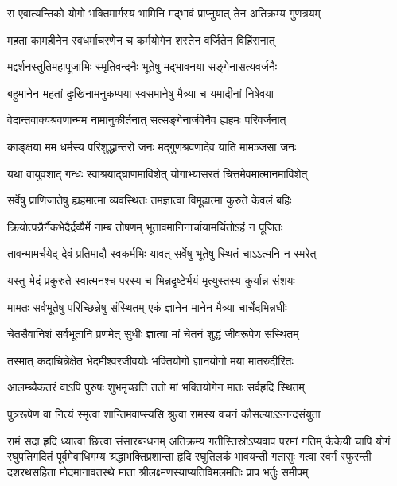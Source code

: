 \twolineshloka
{स एवात्यन्तिको योगो भक्तिमार्गस्य भामिनि}
{मद्भावं प्राप्नुयात् तेन अतिक्रम्य गुणत्रयम्} %

\twolineshloka
{महता कामहीनेन स्वधर्माचरणेन च}
{कर्मयोगेन शस्तेन वर्जितेन विहिंसनात्} %

\twolineshloka
{मद्दर्शनस्तुतिमहापूजाभिः स्मृतिवन्दनैः}
{भूतेषु मद्भावनया सङ्गेनासत्यवर्जनैः} %

\twolineshloka
{बहुमानेन महतां दुःखिनामनुकम्पया}
{स्वसमानेषु मैत्र्या च यमादीनां निषेवया} %

\twolineshloka
{वेदान्तवाक्यश्रवणान्मम नामानुकीर्तनात्}
{सत्सङ्गेनार्जवेनैव ह्यहमः परिवर्जनात्} %

\twolineshloka
{काङ्क्षया मम धर्मस्य परिशुद्धान्तरो जनः}
{मद्गुणश्रवणादेव याति मामञ्जसा जनः} %

\twolineshloka
{यथा वायुवशाद् गन्धः स्वाश्रयाद्\mbox{}घ्राणमाविशेत्}
{योगाभ्यासरतं चित्तमेवमात्मानमाविशेत्} %

\twolineshloka
{सर्वेषु प्राणिजातेषु ह्यहमात्मा व्यवस्थितः}
{तमज्ञात्वा विमूढात्मा कुरुते केवलं बहिः} %

\twolineshloka
{क्रियोत्पन्नैर्नैकभेदैर्द्रव्यैर्मे नाम्ब तोषणम्}
{भूतावमानिनार्चायामर्चितोऽहं न पूजितः} %

\twolineshloka
{तावन्मामर्चयेद् देवं प्रतिमादौ स्वकर्मभिः}
{यावत् सर्वेषु भूतेषु स्थितं चाऽऽत्मनि न स्मरेत्} %

\twolineshloka
{यस्तु भेदं प्रकुरुते स्वात्मनश्च परस्य च}
{भिन्नदृष्टेर्भयं मृत्युस्तस्य कुर्यान्न संशयः} %

\twolineshloka
{मामतः सर्वभूतेषु परिच्छिन्नेषु संस्थितम्}
{एकं ज्ञानेन मानेन मैत्र्या चार्चेदभिन्नधीः} %

\twolineshloka
{चेतसैवानिशं सर्वभूतानि प्रणमेत् सुधीः}
{ज्ञात्वा मां चेतनं शुद्धं जीवरूपेण संस्थितम्} %

\twolineshloka
{तस्मात् कदाचिन्नेक्षेत भेदमीश्वरजीवयोः}
{भक्तियोगो ज्ञानयोगो मया मातरुदीरितः} %

\twolineshloka
{आलम्ब्यैकतरं वाऽपि पुरुषः शुभमृच्छति}
{ततो मां भक्तियोगेन मातः सर्वहृदि स्थितम्} %

\twolineshloka
{पुत्ररूपेण वा नित्यं स्मृत्वा शान्तिमवाप्स्यसि}
{श्रुत्वा रामस्य वचनं कौसल्याऽऽनन्दसंयुता} %

\twolineshloka
{रामं सदा हृदि ध्यात्वा छित्त्वा संसारबन्धनम्}
{अतिक्रम्य गतीस्तिस्रोऽप्यवाप परमां गतिम्} %
\setlength{\shlokaspaceskip}{10pt}
\fourlineindentedshloka
{कैकेयी चापि योगं रघुपतिगदितं पूर्वमेवाधिगम्य}
{श्रद्धाभक्तिप्रशान्ता हृदि रघुतिलकं भावयन्ती गतासुः}
{गत्वा स्वर्गं स्फुरन्ती दशरथसहिता मोदमानावतस्थे}
{माता श्रीलक्ष्मणस्याप्यतिविमलमतिः प्राप भर्तुः समीपम्} %
\setlength{\shlokaspaceskip}{24pt}



